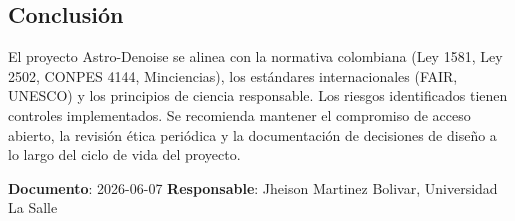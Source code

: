 \subsection{Conclusión}

El proyecto Astro-Denoise se alinea con la normativa colombiana (Ley 1581, Ley 2502, CONPES 4144, Minciencias), los estándares internacionales (FAIR, UNESCO) y los principios de ciencia responsable. Los riesgos identificados tienen controles implementados. Se recomienda mantener el compromiso de acceso abierto, la revisión ética periódica y la documentación de decisiones de diseño a lo largo del ciclo de vida del proyecto.

\bigskip

\textbf{Documento}: 2026-06-07 \hfill \textbf{Responsable}: Jheison Martinez Bolivar, Universidad La Salle
